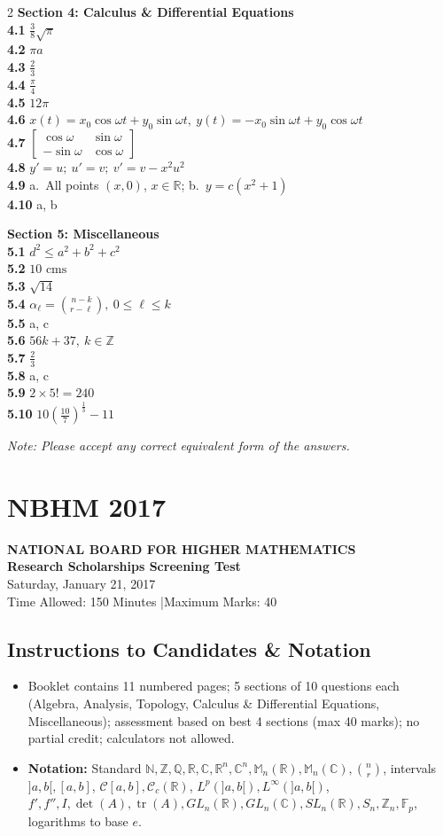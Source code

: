 \documentclass[11pt,a4paper]{article}
\newcommand{\N}{\mathbb{N}}
\newcommand{\Z}{\mathbb{Z}}
\newcommand{\Q}{\mathbb{Q}}
\newcommand{\R}{\mathbb{R}}
\newcommand{\C}{\mathbb{C}}
\newcommand{\F}{\mathbb{F}}
\newcommand{\M}{\mathbb{M}}
\newcommand{\tr}{\operatorname{tr}}
\newcommand{\examheader}[4]{%
  \clearpage
  \section{#1}
  \begin{center}
    {\large\bfseries NATIONAL BOARD FOR HIGHER MATHEMATICS}\\[3pt]
    {\bfseries #2}\\[2pt]
    {#3}\\[2pt]
    {\small #4}
  \end{center}
  \vspace{4pt}
}
\begin{document}
\begin{multicols}{2}
\medskip
\textbf{Section 4: Calculus \& Differential Equations}\\
\textbf{4.1} $\frac{3}{8}\sqrt{\pi}$\\
\textbf{4.2} $\pi a$\\
\textbf{4.3} $\frac{2}{3}$\\
\textbf{4.4} $\frac{\pi}{4}$\\
\textbf{4.5} $12\pi$\\
\textbf{4.6} $x(t) = x_0\cos\omega t + y_0\sin\omega t,\ y(t) = -x_0\sin\omega t + y_0\cos\omega t$\\
\textbf{4.7} $\begin{bmatrix} \cos\omega & \sin\omega \\ -\sin\omega & \cos\omega \end{bmatrix}$\\
\textbf{4.8} $y' = u;\ u' = v;\ v' = v - x^2 u^2$\\
\textbf{4.9} a.\ All points $(x, 0)$, $x \in \R$; b.\ $y = c(x^2 + 1)$\\
\textbf{4.10} a, b

\medskip
\textbf{Section 5: Miscellaneous}\\
\textbf{5.1} $d^2 \le a^2 + b^2 + c^2$\\
\textbf{5.2} $10\text{ cms}$\\
\textbf{5.3} $\sqrt{14}$\\
\textbf{5.4} $\alpha_\ell = \binom{n-k}{r-\ell},\ 0 \le \ell \le k$\\
\textbf{5.5} a, c\\
\textbf{5.6} $56k + 37,\ k \in \Z$\\
\textbf{5.7} $\frac{2}{3}$\\
\textbf{5.8} a, c\\
\textbf{5.9} $2 \times 5! = 240$\\
\textbf{5.10} $10\left(\frac{10}{7}\right)^{\frac{1}{3}} - 11$

\medskip
\noindent\emph{Note: Please accept any correct equivalent form of the answers.}
\end{multicols}
\examheader{NBHM 2017}{Research Scholarships Screening Test}{Saturday, January 21, 2017}{Time Allowed: 150 Minutes \quad|\quad Maximum Marks: 40}

\subsection*{Instructions to Candidates \& Notation}
\begin{itemize}
  \item Booklet contains 11 numbered pages; 5 sections of 10 questions each (Algebra, Analysis, Topology, Calculus \& Differential Equations, Miscellaneous); assessment based on best 4 sections (max 40 marks); no partial credit; calculators not allowed.
  \item \textbf{Notation:} Standard $\N, \Z, \Q, \R, \C, \R^n, \C^n, \M_n(\R), \M_n(\C), \binom{n}{r}$, intervals $]a, b[, [a, b]$, $\mathcal{C}[a, b], \mathcal{C}_c(\R)$, $L^p(]a, b[), L^\infty(]a, b[)$, $f', f'', I, \det(A), \tr(A), GL_n(\R), GL_n(\C), SL_n(\R), S_n, \Z_n, \F_p$, logarithms to base $e$.
\end{itemize}
\end{document}
